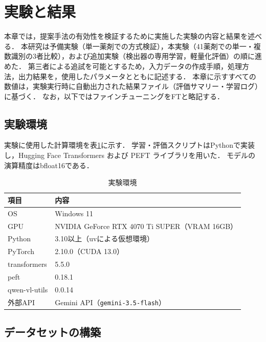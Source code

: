 \documentclass[dvipdfmx]{jsarticle}
\begin{document}
\newpage

\section{実験と結果}\label{sec4}

本章では，提案手法の有効性を検証するために実施した実験の内容と結果を述べる．
本研究は予備実験（単一薬剤での方式検証），本実験（41薬剤での単一・複数識別の3者比較），および追加実験（検出器の専用学習，軽量化評価）の順に進めた．
第三者による追試を可能とするため，入力データの作成手順，処理方法，出力結果を，使用したパラメータとともに記述する．
本章に示すすべての数値は，実験実行時に自動出力された結果ファイル（評価サマリー・学習ログ）に基づく．
なお，以下ではファインチューニングをFTと略記する．

\subsection{実験環境}

実験に使用した計算環境を表\ref{tab:env}に示す．
学習・評価スクリプトはPythonで実装し，Hugging Face Transformers および PEFT ライブラリを用いた．
モデルの演算精度はbfloat16である．

\begin{table}[htbp]
\centering
\caption{実験環境}
\label{tab:env}
\begin{tabular}{ll}
\hline
項目 & 内容 \\
\hline
OS & Windows 11 \\
GPU & NVIDIA GeForce RTX 4070 Ti SUPER（VRAM 16GB） \\
Python & 3.10以上（uvによる仮想環境） \\
PyTorch & 2.10.0（CUDA 13.0） \\
transformers & 5.5.0 \\
peft & 0.18.1 \\
qwen-vl-utils & 0.0.14 \\
外部API & Gemini API（\texttt{gemini-3.5-flash}） \\
\hline
\end{tabular}
\end{table}

\subsection{データセットの構築}\label{sec:dataset}
\end{document}

